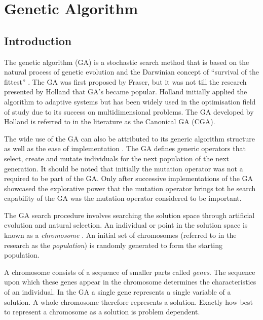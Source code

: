 \section{Genetic Algorithm}
\label{sec:geneticalgorithm}
\subsection{Introduction}
The genetic algorithm (GA) is a stochastic search method that is based on the natural process of genetic evolution and the Darwinian concept of ``survival of the fittest'' \cite{DistributedHierarchicalGA,AcceleratingGA,AdaptiveSAGA,FamilyGA}. The \gls{GA} was first proposed by Fraser, but it was not till the research presented by Holland that \gls{GA}'s became popular\cite{CompuIntelligenceIntro}. Holland initially applied the algorithm to adaptive systems but has been widely used in the optimisation field of study due to its success on multidimensional problems\cite{ParallelGASA,DistributedHierarchicalGA,FamilyGA}. The \gls{GA} developed by Holland is referred to in the literature as the Canonical \gls{GA} (CGA)\cite{CompuIntelligenceIntro}.

The wide use of the \gls{GA} can also be attributed to its generic algorithm structure as well as the ease of implementation \cite{FamilyGA,AdaptiveSAGA}. The \gls{GA} defines generic operators that select, create and mutate individuals for the next population of the next generation\cite{CompuIntelligenceIntro}. It should be noted that initially the mutation operator was not a required to be part of the \gls{GA}. Only after successive implementations of the \gls{GA} showcased the explorative power that the mutation operator brings tot he search capability of the \gls{GA} was the mutation operator considered to be important\cite{CompuIntelligenceIntro}. 


The \gls{GA} search procedure involves searching the solution space through artificial evolution and natural selection\cite{FamilyGA,MultiPopGA,HybridIntelliGA}. An individual or point in the solution space is known as a \emph{chromosome} \cite{HumanPassiveGA}. An initial set of chromosomes (referred to in the research as the \emph{population}) is randomly generated to form the starting population\cite{FamilyGA,HybridIntelliGA,AcceleratingGA,MultiPopGA}. 

A chromosome consists of a sequence of smaller parts called \emph{genes}\cite{CompuIntelligenceIntro}. The sequence upon which these genes appear in the chromosome determines the characteristics of an individual\cite{CompuIntelligenceIntro}. In the \gls{GA} a single gene represents a single variable of a solution\cite{FamilyGA,AcceleratingGA}. A whole chromosome therefore represents a solution\cite{FamilyGA,AcceleratingGA}. Exactly how best to represent a chromosome as a solution is problem dependent\cite{CompuIntelligenceIntro}.

